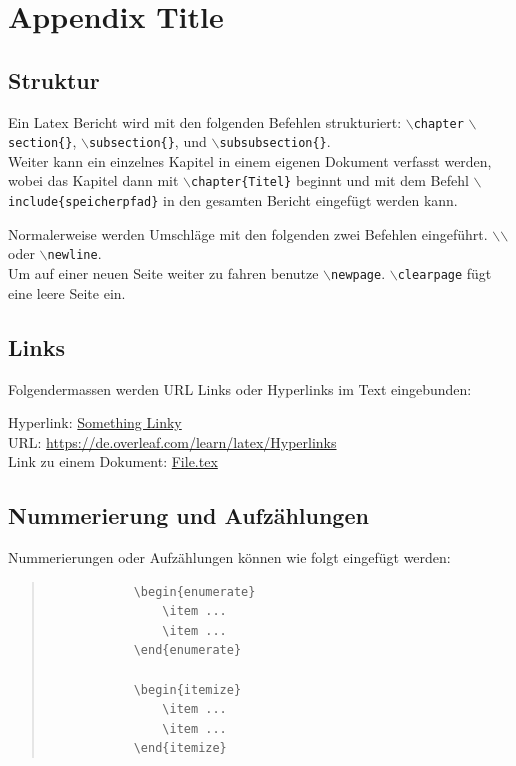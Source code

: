 \section{Appendix Title}
	
	\subsection{Struktur}
	
	Ein Latex Bericht wird mit den folgenden Befehlen strukturiert: \texttt{$\backslash$chapter}
	\texttt{$\backslash$section\{\}}, \texttt{$\backslash$subsection\{\}}, und \texttt{$\backslash$subsubsection\{\}}.\\
	
	Weiter kann ein einzelnes Kapitel in einem eigenen Dokument verfasst werden, wobei das Kapitel dann mit \texttt{$\backslash$chapter\{Titel\}} beginnt und mit dem Befehl \texttt{$\backslash$include\{speicherpfad\}} in den gesamten Bericht eingefügt werden kann.
	
	Normalerweise werden Umschläge mit den folgenden zwei Befehlen eingeführt.
	\texttt{$\backslash$$\backslash$} oder \texttt{$\backslash$newline}. \\
	Um auf einer neuen Seite weiter zu fahren benutze \texttt{$\backslash$newpage}.
	\texttt{$\backslash$clearpage} fügt eine leere Seite ein.
	
	
	\subsection{Links}
	
	Folgendermassen werden URL Links oder Hyperlinks im Text eingebunden:
	
	Hyperlink: \href{https://de.overleaf.com/learn/latex/Hyperlinks}{Something Linky}\\
	URL: \url{https://de.overleaf.com/learn/latex/Hyperlinks}\\
	Link zu einem Dokument: \href{run:./Vorlage-Paper.tex}{File.tex}
	
	
	\subsection{Nummerierung und Aufzählungen}
	
	Nummerierungen oder Aufzählungen können wie folgt eingefügt werden:
	\begin{quote}
		\begin{verbatim}
			\begin{enumerate}
				\item ...
				\item ...
			\end{enumerate}
			
			\begin{itemize}
				\item ...
				\item ...
			\end{itemize}
		\end{verbatim}
	\end{quote}
	

